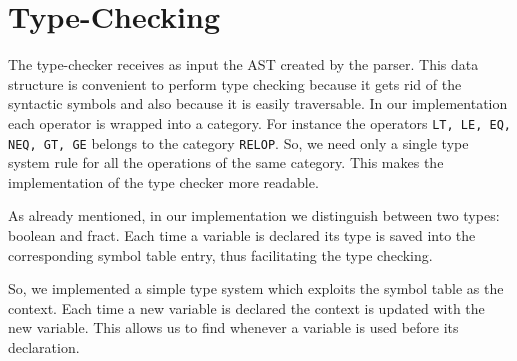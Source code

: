 \section{Type-Checking}
\label{sec:type-checking}

The type-checker receives as input the AST created by the 
parser. This data structure is convenient to perform
type checking because it gets rid of the syntactic symbols and also because it 
is easily traversable.
In our implementation each operator is wrapped into a category.
For instance the operators \verb|LT, LE, EQ, NEQ, GT, GE| belongs to the 
category \verb|RELOP|. So, we need only a single type system rule for all the
operations of the same category.
This makes the implementation of the type checker more readable.


As already mentioned, in our implementation we distinguish between two types:
boolean and fract. Each time a variable is declared its type is saved into the 
corresponding symbol table entry, thus facilitating the type checking.

So, we implemented a simple type system which exploits the symbol
table as the context. Each time a new variable is declared 
the context is updated with the new variable. This allows us to find whenever
a variable is used before its declaration.
